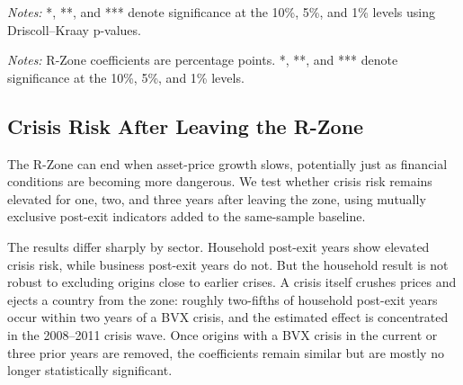 \documentclass[11pt]{article}
\begin{document}
\begin{table}[H]
\centering
\caption{\textbf{The footnote-10 verdict.} Static and dynamic R-Zone
coefficients (percentage points) with the tightest precommitted criterion,
whether the dynamic estimate lies within one static standard error. Every
cell passes all three precommitted criteria, confirming the paper's unshown
robustness claim.}
\label{tab:fn10}
\small


\medskip
\footnotesize
\textit{Notes:} *, **, and *** denote significance at the 10\%, 5\%, and 1\%
levels using Driscoll--Kraay p-values.
\end{table}

\begin{table}[H]
\centering
\caption{\textbf{Static versus autoregressive crisis models.} The table
compares the R-Zone coefficient, within fit, and in-sample AUC on identical
samples. Adding memory consistently improves fit and classification, but the
gains are moderate at longer horizons and should not be interpreted as
out-of-sample evidence. Subscripts 0 and 1 denote the static and dynamic
models.}
\label{tab:dynamic}
\scriptsize


\medskip
\footnotesize
\textit{Notes:} R-Zone coefficients are percentage points. *, **, and ***
denote significance at the 10\%, 5\%, and 1\% levels.
\end{table}

\subsection{Crisis Risk After Leaving the R-Zone}

The R-Zone can end when asset-price growth slows, potentially just as
financial conditions are becoming more dangerous. We test whether crisis
risk remains elevated for one, two, and three years after leaving the zone,
using mutually exclusive post-exit indicators added to the same-sample
baseline.

The results differ sharply by sector. Household post-exit years show
elevated crisis risk, while business post-exit years do not. But the
household result is not robust to excluding origins close to earlier crises.
A crisis itself crushes prices and ejects a country from the zone: roughly
two-fifths of household post-exit years occur within two years of a BVX
crisis, and the estimated effect is concentrated in the 2008--2011 crisis
wave. Once origins with a BVX crisis in the current or three prior years are
removed, the coefficients remain similar but are mostly no longer
statistically significant.
\end{document}
